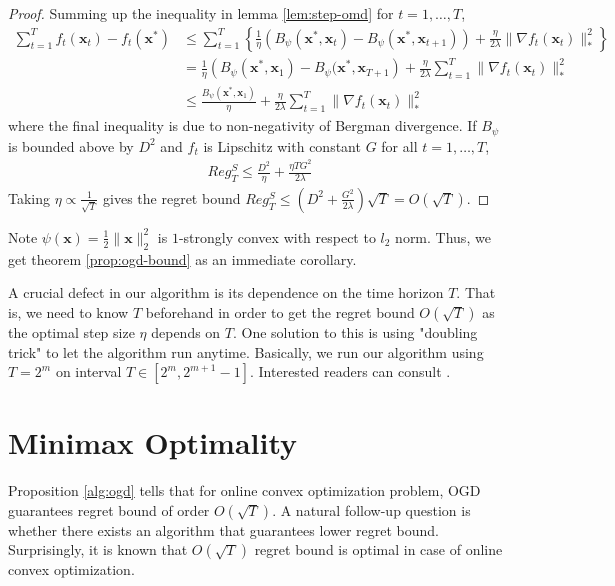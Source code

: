 \documentclass[12pt, a4paper]{report}
\begin{document}
\begin{proof}
Summing up the inequality in lemma \ref{lem:step-omd} for $t = 1, \dots, T$,
\begin{align*}
    \sum_{t=1}^T f_t(\mathbf{x}_t) - f_t(\mathbf{x}^*) &\leq \sum_{t=1}^T \left\{ \frac{1}{\eta}\left(B_\psi(\mathbf{x}^*, \mathbf{x}_t) - B_\psi(\mathbf{x}^*, \mathbf{x}_{t+1}) \right) + \frac{\eta}{2\lambda} \lVert \nabla f_t(\mathbf{x}_t) \rVert_*^2 \right\}
    \\
    &= \frac{1}{\eta} \left( B_\psi(\mathbf{x}^*, \mathbf{x}_1) - B_\psi(\mathbf{x}^*, \mathbf{x}_{T+1} \right) + \frac{\eta}{2\lambda} \sum_{t=1}^T \lVert \nabla f_t(\mathbf{x}_t) \rVert_*^2
    \\
    &\leq \frac{B_\psi(\mathbf{x}^*, \mathbf{x}_1)}{\eta} + \frac{\eta}{2\lambda} \sum_{t=1}^{T} \lVert \nabla f_t(\mathbf{x}_t) \rVert_*^2
\end{align*}
where the final inequality is due to non-negativity of Bergman divergence. If $B_\psi$ is bounded above by $D^2$ and $f_t$ is Lipschitz with constant $G$ for all $t = 1, \dots, T$,
\begin{align*}
    Reg_T^S \leq \frac{D^2}{\eta} + \frac{\eta TG^2}{2\lambda}
\end{align*}
Taking $\eta \propto \frac{1}{\sqrt{T}}$ gives the regret bound $Reg_T^S \leq \left(D^2 + \frac{G^2}{2\lambda}\right)\sqrt{T} = O(\sqrt{T})$.
\end{proof}
Note $\psi(\mathbf{x}) = \frac{1}{2} \lVert \mathbf{x} \rVert_2^2$ is $1$-strongly convex with respect to $l_2$ norm. Thus, we get theorem \ref{prop:ogd-bound} as an immediate corollary.

\begin{rem}
A crucial defect in our algorithm is its dependence on the time horizon $T$. That is, we need to know $T$ beforehand in order to get the regret bound $O(\sqrt{T})$ as the optimal step size $\eta$ depends on $T$. One solution to this is using "doubling trick" \cite{Auer1995GamblingIA} to let the algorithm run anytime. Basically, we run our algorithm using  $T=2^m$ on interval $T \in [2^m, 2^{m+1} - 1]$. Interested readers can consult \cite[Chapter2]{CesaBianchi2006PredictionLA}.    
\end{rem}


\section{Minimax Optimality} \label{sec:minimax}
Proposition \ref{alg:ogd} tells that for online convex optimization problem, OGD guarantees regret bound of order $O(\sqrt{T})$. A natural follow-up question is whether there exists an algorithm that guarantees lower regret bound. Surprisingly, it is known that $O(\sqrt{T})$ regret bound is optimal in case of online convex optimization. 
\end{document}
